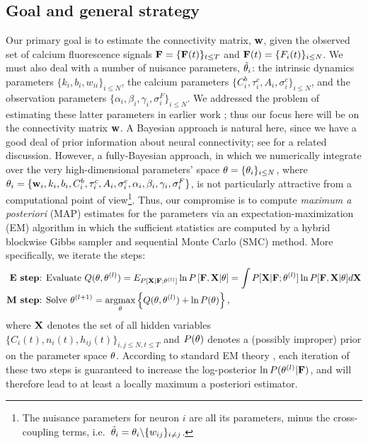 \subsection{Goal and general strategy}  \label{sec:methods:goal}

Our primary goal is to estimate the connectivity matrix, $\mathbf{w}$, given the observed set of calcium fluorescence signals ${\bf F}=\{{\bf F}(t)\}_{t\leq T}$ and ${\bf F}(t)=\{F_i(t)\}_{i\leq N}$. We must also deal with a number of nuisance parameters, $\tilde{\mathbf{\theta}}_i$: the intrinsic dynamics parameters $\{k_i, b_i, w_{ii}\}_{i\leq N}$, the calcium parameters $\{C^b_i, \tau^c_i, A_i, \sigma^c_i\}_{i\leq N}$, and the observation parameters $\{\alpha_i, \beta_i, \gamma_i, \sigma^F_i\}_{i\leq N}$. We addressed the problem of estimating these latter parameters in earlier work \cite{Vogelstein2009}; thus our focus here will be on the connectivity matrix $\mathbf{w}$. A Bayesian approach is natural here, since we have a good deal of prior information about neural connectivity; see \cite{Rigat06} for a related discussion. However, a fully-Bayesian approach, in which we numerically integrate over the very high-dimensional parameters' space $\mathbf{\theta}= \{\mathbf{\theta}_i\}_{i\leq N}$, where $\mathbf{\theta}_i=\{\mathbf{w}_i, k_i, b_i, C^b_i, \tau^c_i, A_i, \sigma^c_i, \alpha_i, \beta_i, \gamma_i, \sigma^F_i\}$, is not particularly attractive from a computational point of view\footnote{The nuisance parameters for neuron $i$ are all its parameters, minus the cross-coupling terms, i.e.\ $\tilde{\mathbf{\theta}}_i =\mathbf{\theta}_i \backslash \{w_{ij}\}_{i\neq j}$.}. Thus, our compromise is to compute \emph{maximum a posteriori} (MAP) estimates for the parameters via an expectation-maximization (EM) algorithm in which the sufficient statistics are computed by a hybrid blockwise Gibbs sampler and sequential Monte Carlo (SMC) method. More specifically, we iterate the steps:
\begin{align*}
\textbf{E step} &\text{: Evaluate } Q(\bth,\bth^{(l)}) = E_{P[\bX |
\bF; \bth^{(l)}]} \ln P \left[ \bF, \bX | \bth \right] = \int P[\bX |
\bF; \bth^{(l)}] \ln P[\bF, \bX | \bth] d \bX \\ \textbf{M step}
&\text{: Solve } \bth^{(l+1)} = \argmax_{\bth} \left\{
Q(\bth,\bth^{(l)}) + \ln P(\bth) \right\},
\end{align*}
where ${\bf X}$ denotes the set of all hidden variables $\{ C_i(t), n_i(t), h_{ij}(t) \}_{i,j \leq N, t \leq T}$ and $P(\mathbf{\theta})$ denotes a (possibly improper) prior on the parameter space $\mathbf{\theta}$. According to standard EM theory \cite{DLR77,McLachlanKrishnan96}, each iteration of these two steps is guaranteed to increase the log-posterior $\ln P(\mathbf{\theta}^{(l)} | {\bf F})$, and will therefore lead to at least a locally maximum a posteriori estimator.


